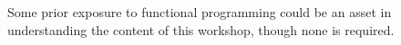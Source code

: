 Some prior exposure to functional programming could be an asset in understanding the content of this workshop, though none is required.
